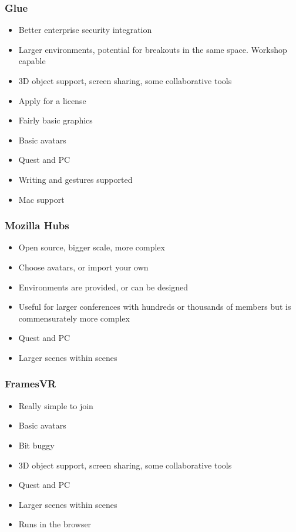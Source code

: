 \subsubsection{Glue}
\begin{itemize}
\item Better enterprise security integration
\item Larger environments, potential for breakouts in the same space. Workshop capable
\item 3D object support, screen sharing, some collaborative tools
\item Apply for a license
\item Fairly basic graphics
\item Basic avatars
\item Quest and PC
\item Writing and gestures supported
\item Mac support
\end{itemize}
\subsubsection{Mozilla Hubs}
\begin{itemize}
\item Open source, bigger scale, more complex
\item Choose avatars, or import your own
\item Environments are provided, or can be designed
\item Useful for larger conferences with hundreds or thousands of members but is commensurately more complex
\item Quest and PC
\item Larger scenes within scenes
\end{itemize}
\subsubsection{FramesVR}
\begin{itemize}
\item Really simple to join
\item Basic avatars
\item Bit buggy
\item 3D object support, screen sharing, some collaborative tools
\item Quest and PC
\item Larger scenes within scenes
\item Runs in the browser
\end{itemize}
